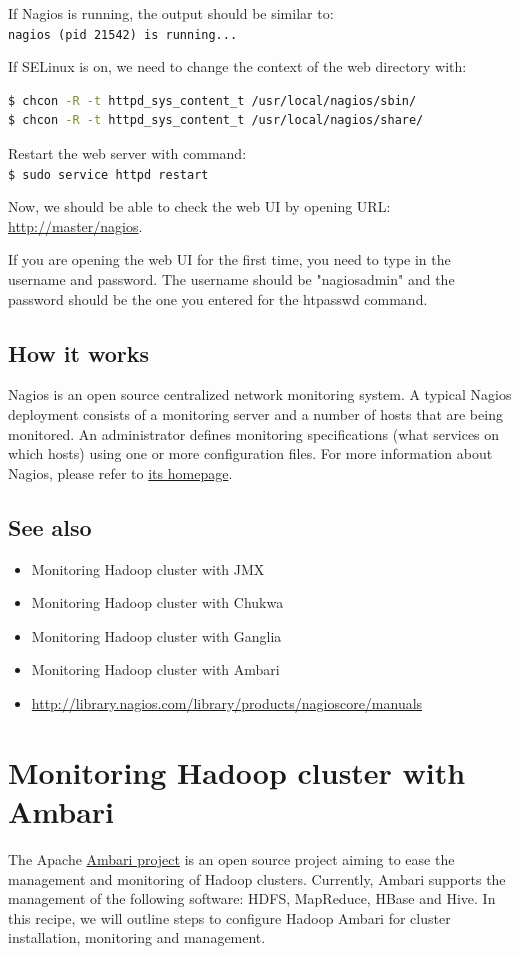 If Nagios is running, the output should be similar to:\\
\verb|nagios (pid 21542) is running...|

If SELinux is on, we need to change the context of the web directory with:
\lstset{style=bashstyle}
\begin{lstlisting}[language=bash]
$ chcon -R -t httpd_sys_content_t /usr/local/nagios/sbin/
$ chcon -R -t httpd_sys_content_t /usr/local/nagios/share/
\end{lstlisting}

Restart the web server with command:\\
\verb|$ sudo service httpd restart|

Now, we should be able to check the web UI by opening URL: \url{http://master/nagios}.

If you are opening the web UI for the first time, you need to type in the username and password. The username should be "nagiosadmin" and the password should be the one you entered for the htpasswd command.

\subsection*{How it works}
Nagios is an open source centralized network monitoring system. A typical Nagios deployment consists of a monitoring server and a number of hosts that are being monitored. An administrator defines monitoring specifications (what services on which hosts) using one or more configuration files. For more information about Nagios, please refer to \href{http://www.nagios.org}{its homepage}.
\subsection*{See also}
\begin{itemize}
  \item Monitoring Hadoop cluster with JMX
  \item Monitoring Hadoop cluster with Chukwa 
  \item Monitoring Hadoop cluster with Ganglia
  \item Monitoring Hadoop cluster with Ambari
  \item \url{http://library.nagios.com/library/products/nagioscore/manuals}
\end{itemize}

\section{Monitoring Hadoop cluster with Ambari}
The Apache \href{http://incubator.apache.org/ambari/}{Ambari project} is an open source project aiming to ease the management and monitoring of Hadoop clusters. Currently, Ambari supports the management of the following software: HDFS, MapReduce, HBase and Hive. In this recipe, we will outline steps to configure Hadoop Ambari for cluster installation, monitoring and management.
